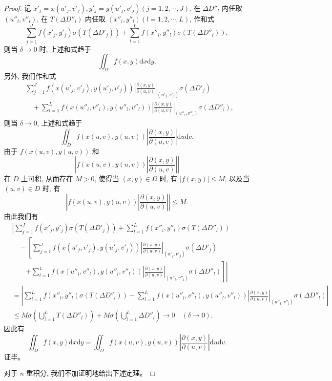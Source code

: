 \documentclass[UTF8,12pt,a4paper,fontset=fandol]{ctexart}
\begin{document}
\begin{proof}
记 $x'_j=x(u'_j,v'_j), y'_j=y(u'_j,v'_j)(j=1,2,\cdots,J)$. 在 $\Delta D''_l$ 内任取 $(u''_l,v''_l)$, 在 $T(\Delta D''_l)$ 内任取 $(x''_l,y''_l)(l=1,2,\cdots,L)$, 作和式
\begin{equation}
  \sum_{j=1}^J f(x'_j,y'_j)\sigma(T(\Delta D'_j))
  +\sum_{l=1}^L f(x''_l,y''_l)\sigma(T(\Delta D''_l)),
  \label{course-eq-15-4-1}
\end{equation}
则当 $\delta\to0$ 时, 上述和式趋于
\[
  \iint_\Omega f(x,y)\mathrm dx\mathrm dy.
\]
另外, 我们作和式
\begin{equation}
\begin{aligned}
  &\sum_{j=1}^J f(x(u'_j,v'_j),y(u'_j,v'_j))
  \left|\frac{\partial(x,y)}{\partial(u,v)}\right|_{(u'_j,v'_j)}
  \sigma(\Delta D'_j)\\
  &\quad+\sum_{l=1}^L f(x(u''_l,v''_l),y(u''_l,v''_l))
  \left|\frac{\partial(x,y)}{\partial(u,v)}\right|_{(u''_l,v''_l)}
  \sigma(\Delta D''_l),
\end{aligned}
  \label{course-eq-15-4-2}
\end{equation}
则当 $\delta\to0$, 上述和式趋于
\[
  \iint_D f(x(u,v),y(u,v))
  \left|\frac{\partial(x,y)}{\partial(u,v)}\right|\mathrm du\mathrm dv.
\]
由于 $f(x(u,v),y(u,v))$ 和
\[
  \left|f(x(u,v),y(u,v))\left|\frac{\partial(x,y)}{\partial(u,v)}\right|\right|
\]
在 $D$ 上可积, 从而存在 $M>0$, 使得当 $(x,y)\in\Omega$ 时, 有 $|f(x,y)|\leqslant M$, 以及当 $(u,v)\in D$ 时, 有
\[
  \left|f(x(u,v),y(u,v))\left|\frac{\partial(x,y)}{\partial(u,v)}\right|\right|\leqslant M.
\]
由此我们有
\[
\begin{aligned}
  &\left|
  \sum_{j=1}^J f(x'_j,y'_j)\sigma(T(\Delta D'_j))
  +\sum_{l=1}^L f(x''_l,y''_l)\sigma(T(\Delta D''_l))\right.\\
  &\quad-\left[
  \sum_{j=1}^J f(x(u'_j,v'_j),y(u'_j,v'_j))
  \left|\frac{\partial(x,y)}{\partial(u,v)}\right|_{(u'_j,v'_j)}
  \sigma(\Delta D'_j)\right.\\
  &\qquad\left.\left.
  +\sum_{l=1}^L f(x(u''_l,v''_l),y(u''_l,v''_l))
  \left|\frac{\partial(x,y)}{\partial(u,v)}\right|_{(u''_l,v''_l)}
  \sigma(\Delta D''_l)\right]\right|\\
  &=\left|
  \sum_{l=1}^L f(x''_l,y''_l)\sigma(T(\Delta D''_l))
  -\sum_{l=1}^L f(x(u''_l,v''_l),y(u''_l,v''_l))
  \left|\frac{\partial(x,y)}{\partial(u,v)}\right|_{(u''_l,v''_l)}
  \sigma(\Delta D''_l)\right|\\
  &\leqslant M\sigma\left(\bigcup_{l=1}^L T(\Delta D''_l)\right)
  +M\sigma\left(\bigcup_{l=1}^L\Delta D''_l\right)\to0\quad(\delta\to0).
\end{aligned}
\]
因此有
\[
  \iint_\Omega f(x,y)\mathrm dx\mathrm dy
  =\iint_D f(x(u,v),y(u,v))
  \left|\frac{\partial(x,y)}{\partial(u,v)}\right|\mathrm du\mathrm dv.
\]
证毕。

对于 $n$ 重积分, 我们不加证明地给出下述定理。

\end{proof}
\end{document}
